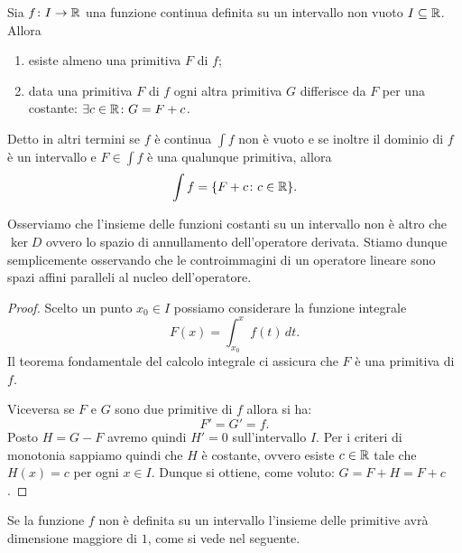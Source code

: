 \begin{theorem}
\label{th:primitive}
\mymark{***}
Sia $f\colon I \to {\mathbb R}$
una funzione continua definita su un intervallo non vuoto $I\subseteq {\mathbb R}$. Allora
\begin{enumerate}
\item esiste almeno una primitiva $F$ di $f$;
\item data una primitiva $F$ di $f$ ogni altra
primitiva $G$ differisce da $F$ per una costante: $\exists c\in {\mathbb R}\colon G= F+c$.
\end{enumerate}

Detto in altri termini se $f$ è continua $\int f$ non è vuoto e se inoltre 
il dominio di $f$ è un intervallo e $F\in \int f$ è una qualunque primitiva, allora
\[
  \int f = {\left\{ F+c \colon c \in {\mathbb R} \right\}}.
\]
\end{theorem}

Osserviamo che l'insieme delle funzioni costanti
su un intervallo
non è altro che $\ker D$ ovvero lo spazio di annullamento dell'operatore derivata.
Stiamo dunque semplicemente osservando che le controimmagini di un operatore
lineare sono spazi affini paralleli al nucleo dell'operatore.

\begin{proof}
\mymark{***}
Scelto un punto $x_0\in I$ possiamo
considerare la funzione integrale
\[
  F(x) = \int_{x_0}^x f(t)\, dt.
\]
Il teorema fondamentale del calcolo integrale
ci assicura che $F$ è una primitiva di $f$.

Viceversa se $F$ e $G$ sono due primitive di $f$ allora si ha:
\[
  F' = G' = f.
\]
Posto $H=G-F$ avremo quindi $H'=0$ sull'intervallo $I$. Per i criteri di
monotonia sappiamo quindi che $H$ è costante, ovvero esiste $c\in {\mathbb R}$ tale
che $H(x)=c$ per ogni $x\in I$. Dunque si ottiene, come voluto: $G=F+H=F+c$.
\end{proof}

Se la funzione $f$ non è definita su un intervallo l'insieme delle primitive
avrà dimensione maggiore di $1$, come si vede nel seguente.

